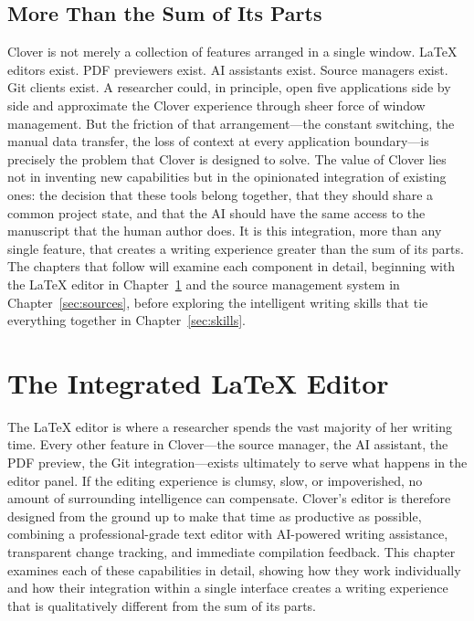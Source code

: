 \documentclass[a4paper,11pt]{article}
\begin{document}
\subsection{More Than the Sum of Its Parts}

Clover is not merely a collection of features arranged in a single window. \LaTeX{} editors exist. PDF previewers exist. AI assistants exist. Source managers exist. Git clients exist. A researcher could, in principle, open five applications side by side and approximate the Clover experience through sheer force of window management. But the friction of that arrangement---the constant switching, the manual data transfer, the loss of context at every application boundary---is precisely the problem that Clover is designed to solve. The value of Clover lies not in inventing new capabilities but in the opinionated integration of existing ones: the decision that these tools belong together, that they should share a common project state, and that the AI should have the same access to the manuscript that the human author does. It is this integration, more than any single feature, that creates a writing experience greater than the sum of its parts. The chapters that follow will examine each component in detail, beginning with the \LaTeX{} editor in Chapter~\ref{sec:editor} and the source management system in Chapter~\ref{sec:sources}, before exploring the intelligent writing skills that tie everything together in Chapter~\ref{sec:skills}.

\newpage

\section{The Integrated LaTeX Editor}
\label{sec:editor}

The \LaTeX{} editor is where a researcher spends the vast majority of her writing time. Every other feature in Clover---the source manager, the AI assistant, the PDF preview, the Git integration---exists ultimately to serve what happens in the editor panel. If the editing experience is clumsy, slow, or impoverished, no amount of surrounding intelligence can compensate. Clover's editor is therefore designed from the ground up to make that time as productive as possible, combining a professional-grade text editor with AI-powered writing assistance, transparent change tracking, and immediate compilation feedback. This chapter examines each of these capabilities in detail, showing how they work individually and how their integration within a single interface creates a writing experience that is qualitatively different from the sum of its parts.
\end{document}
